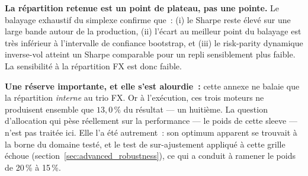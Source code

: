\begin{insightbox}
\textbf{La répartition retenue est un point de plateau, pas une pointe.} Le balayage exhaustif du simplexe confirme que~: (i) le Sharpe reste élevé sur une large bande autour de la production, (ii) l'écart au meilleur point du balayage est très inférieur à l'intervalle de confiance bootstrap, et (iii) le risk-parity dynamique inverse-vol atteint un Sharpe comparable pour un repli sensiblement plus faible. La sensibilité à la répartition FX est donc faible.

\textbf{Une réserve importante, et elle s'est alourdie~:} cette annexe ne balaie que la répartition \emph{interne} au trio FX. Or à l'exécution, ces trois moteurs ne produisent ensemble que $13{,}0\,\%$ du résultat --- un huitième. La question d'allocation qui pèse réellement sur la performance --- le poids de cette sleeve --- n'est pas traitée ici. Elle l'a été autrement~: son optimum apparent se trouvait à la borne du domaine testé, et le test de sur-ajustement appliqué à cette grille échoue (section~\ref{sec:advanced_robustness}), ce qui a conduit à ramener le poids de 20\,\% à 15\,\%.
\end{insightbox}
